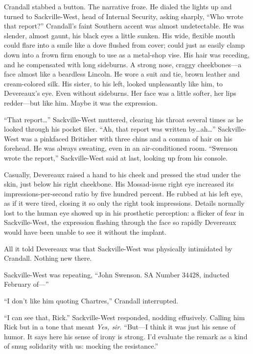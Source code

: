 Crandall stabbed a button. The narrative froze. He dialed the lights up and turned to Sackville-West, head of Internal Security, asking sharply, ``Who wrote that report?'' Crandall's faint Southern accent was almost undetectable. He was slender, almost gaunt, his black eyes a little sunken. His wide, flexible mouth could flare into a smile like a dove flushed from cover; could just as easily clamp down into a frown firm enough to use as a metal-shop vise. His hair was receding, and he compensated with long sideburns. A strong nose, craggy cheekbones---a face almost like a beardless Lincoln. He wore a suit and tie, brown leather and cream-colored silk. His sister, to his left, looked unpleasantly like him, to Devereaux's eye. Even without sideburns. Her face was a little softer, her lips redder---but like him. Maybe it was the expression.

``That report\ldots '' Sackville-West muttered, clearing his throat several times as he looked through his pocket filer. ``Ah, that report was written by\ldots ah\ldots '' Sackville-West was a pinkfaced Britisher with three chins and a comma of hair on his forehead. He was always sweating, even in an air-conditioned room. ``Swenson wrote the report,'' Sackville-West said at last, looking up from his console.

Casually, Devereaux raised a hand to his cheek and pressed the stud under the skin, just below his right cheekbone. His Mossad-issue right eye increased its impressions-per-second ratio by five hundred percent. He rubbed at his left eye, as if it were tired, closing it so only the right took impressions. Details normally lost to the human eye showed up in his prosthetic perception: a flicker of fear in Sackville-West, the expression flashing through the face so rapidly Devereaux would have been unable to see it without the implant.

All it told Devereaux was that Sackville-West was physically intimidated by Crandall. Nothing new there.

Sackville-West was repeating, ``John Swenson. SA Number 34428, inducted February of---''

``I don't like him quoting Chartres,'' Crandall interrupted.

``I can see that, Rick.'' Sackville-West responded, nodding effusively. Calling him Rick but in a tone that meant \textit{Yes, sir.} ``But---I think it was just his sense of humor. It says here his sense of irony is strong. I'd evaluate the remark as a kind of smug solidarity with us: mocking the resistance.''

